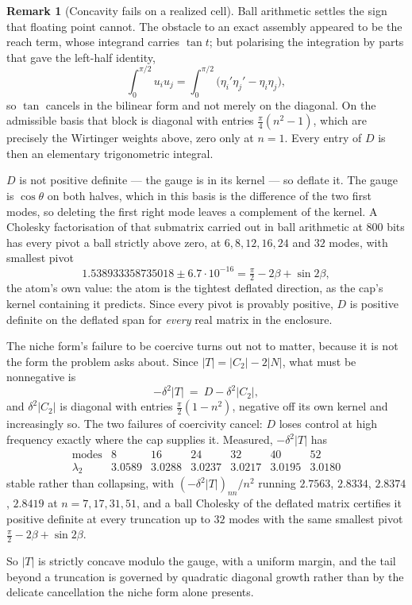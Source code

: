 \documentclass[11pt]{article}
\theoremstyle{definition}
\newtheorem{remark}[theorem]{Remark}
\begin{document}
\begin{remark}[Concavity fails on a realized cell]
Ball arithmetic settles the sign that floating point cannot. The obstacle to an exact
assembly appeared to be the reach term, whose integrand carries $\tan t$; but polarising the
integration by parts that gave the left-half identity,
\[
  \int_0^{\pi/2}u_iu_j=\int_0^{\pi/2}\bigl(\eta_i'\eta_j'-\eta_i\eta_j\bigr) ,
\]
so $\tan$ cancels in the bilinear form and not merely on the diagonal. On the admissible
basis that block is diagonal with entries $\tfrac\pi4(n^2-1)$, which are precisely the
Wirtinger weights above, zero only at $n=1$. Every entry of $D$ is then an elementary
trigonometric integral.

$D$ is not positive definite --- the gauge is in its kernel --- so deflate it. The gauge is
$\cos\theta$ on both halves, which in this basis is the difference of the two first modes,
so deleting the first right mode leaves a complement of the kernel. A Cholesky factorisation
of that submatrix carried out in ball arithmetic at $800$ bits has every pivot a ball
strictly above zero, at $6,8,12,16,24$ and $32$ modes, with smallest pivot
\[
  1.538933358735018\pm6.7\cdot10^{-16}=\tfrac\pi2-2\beta+\sin2\beta ,
\]
the atom's own value: the atom is the tightest deflated direction, as the cap's kernel
containing it predicts. Since every pivot is provably positive, $D$ is positive definite on
the deflated span for \emph{every} real matrix in the enclosure.

The niche form's failure to be coercive turns out not to matter, because it is not the form
the problem asks about. Since $|T|=|C_2|-2|N|$, what must be nonnegative is
\[
  -\delta^2|T|\ =\ D-\delta^2|C_2| ,
\]
and $\delta^2|C_2|$ is diagonal with entries $\tfrac\pi2(1-n^2)$, negative off its own
kernel and increasingly so. The two failures of coercivity cancel: $D$ loses control at high
frequency exactly where the cap supplies it. Measured, $-\delta^2|T|$ has
\[
  \begin{array}{r|cccccc}
    \text{modes} & 8 & 16 & 24 & 32 & 40 & 52\\\hline
    \lambda_2 & 3.0589 & 3.0288 & 3.0237 & 3.0217 & 3.0195 & 3.0180
  \end{array}
\]
stable rather than collapsing, with $(-\delta^2|T|)_{nn}/n^2$ running $2.7563$, $2.8334$, $2.8374$, $2.8419$ at $n=7,17,31,51$, and a ball Cholesky
of the deflated matrix certifies it positive definite at every truncation up to $32$ modes
with the same smallest pivot $\tfrac\pi2-2\beta+\sin2\beta$.

So $|T|$ is strictly concave modulo the gauge, with a uniform margin, and the tail beyond a
truncation is governed by quadratic diagonal growth rather than by the delicate cancellation
the niche form alone presents.


\end{remark}
\end{document}
